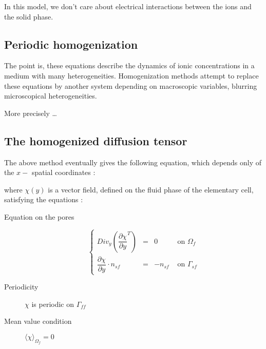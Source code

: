 In this model, we don't care about electrical interactions between the ions and the solid phase.

\subsection{Periodic homogenization}

The point is, these equations describe the dynamics of ionic concentrations in a medium with many heterogeneities. %
Homogenization methods attempt to replace these equations by another system depending on macroscopic variables, %
\og{} blurring \fg{} microscopical heterogeneities.

\par
More precisely \dots











\subsection{The homogenized diffusion tensor}


The above method eventually gives the following equation, which depends only of the $x-$ spatial coordinates :








where $\chi(y)$ is a vector field, defined on the fluid phase of the elementary cell, satisfying the equations :

\begin{description}
\item[Equation on the pores] 
\begin{equation}
\left\{%
\begin{array}{lccr}
Div_y \left( \dfrac{\partial{\chi}}{\partial{y}}^T\right) &=& 0&\text{ on }\Omega_f \\
\dfrac{\partial{\chi}}{\partial{y}} \cdot n_{sf}&=&-n_{sf}&\text{ on }\Gamma_{sf}
\end{array}
\right.
\label{chistr}
\end{equation}
\item[Periodicity] $\chi$ is periodic on $\Gamma_{ff}$
\item[Mean value condition] $\langle\chi\rangle_{\Omega_f}=0$
\end{description}

